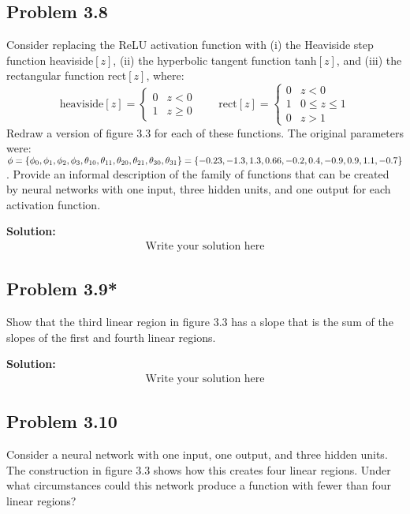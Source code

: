 \documentclass{article}
\begin{document}
    \subsection*{Problem 3.8}
    Consider replacing the ReLU activation function with (i) the Heaviside step function heaviside$[z]$, (ii) the hyperbolic tangent function tanh$[z]$, and (iii) the rectangular function rect$[z]$, where:
    \begin{equation}
        \text{heaviside}[z] = \begin{cases}
            0 & z < 0 \\
            1 & z \geq 0
        \end{cases}
        \qquad
        \text{rect}[z] = \begin{cases}
            0 & z < 0 \\
            1 & 0 \leq z \leq 1 \\
            0 & z > 1
        \end{cases}
        \tag{3.15}
    \end{equation}
    Redraw a version of figure 3.3 for each of these functions. The original parameters were: $\phi = \{\phi_0, \phi_1, \phi_2, \phi_3, \theta_{10}, \theta_{11}, \theta_{20}, \theta_{21}, \theta_{30}, \theta_{31}\} =\\ \{-0.23, -1.3, 1.3, 0.66, -0.2, 0.4, -0.9, 0.9, 1.1, -0.7\}$. Provide an informal description of the family of functions that can be created by neural networks with one input, three hidden units, and one output for each activation function.

        \vspace{1cm}
        \textbf{Solution:}
        \begin{align*}
            \text{Write your solution here}
        \end{align*}

    \subsection*{Problem 3.9*}
    Show that the third linear region in figure 3.3 has a slope that is the sum of the slopes of the first and fourth linear regions.

        \vspace{1cm}
        \textbf{Solution:}
        \begin{align*}
            \text{Write your solution here}
        \end{align*}

    \subsection*{Problem 3.10}
    Consider a neural network with one input, one output, and three hidden units. The construction in figure 3.3 shows how this creates four linear regions. Under what circumstances could this network produce a function with fewer than four linear regions?
\end{document}
